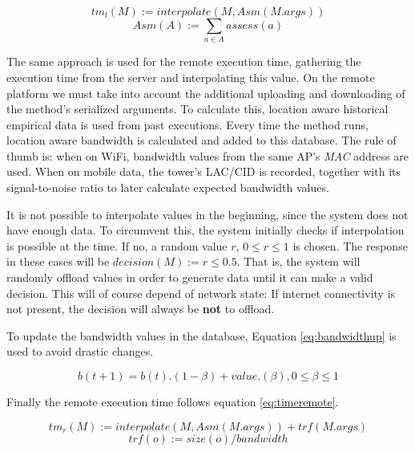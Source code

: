 \documentclass[10pt, conference, letterpaper]{IEEEtran}
\begin{document}
  \begin{equation} \label{eq:timelocal}
    tm_{l}(M) := interpolate(M, Asm(M.args))
  \end{equation}
  \begin{equation}
    Asm(A) := \sum_{a \in A} assess(a)
  \end{equation}

The same approach is used for the remote execution time, gathering the execution time from the server and interpolating this value. On the remote platform we must take into account the additional uploading and downloading of the method's serialized arguments. To calculate this, location aware historical empirical data is used from past executions. Every time the method runs, location aware bandwidth is calculated and added to this database. The rule of thumb is: when on WiFi, bandwidth values from the same AP's \textit{MAC} address are used. When on mobile data, the tower's LAC/CID is recorded, together with its signal-to-noise ratio to later calculate expected bandwidth values.

It is not possible to interpolate values in the beginning, since the system does not have enough data. To circumvent this, the system initially checks if interpolation is possible at the time. If no, a random value $r$, $0 \leq r \leq 1$ is chosen. The response in these cases will be $decision(M) := r \leq 0.5$. That is, the system will randomly offload values in order to generate data until it can make a valid decision. This will of course depend of network state: If internet connectivity is not present, the decision will always be \textbf{not} to offload.

 To update the bandwidth values in the database, Equation \ref{eq:bandwidthup} is used to avoid drastic changes.

  \begin{equation} \label{eq:bandwidthup}
    b(t+1) = b(t) . (1-\beta) + value . (\beta), 0 \leq \beta \leq 1
  \end{equation}

  Finally the remote execution time follows equation \ref{eq:timeremote}.

  \begin{equation} \label{eq:timeremote}
    tm_{r}(M) := interpolate(M, Asm(M.args)) + trf(M.args)
  \end{equation}
  \begin{equation}
    trf(o) := size(o) / bandwidth
  \end{equation}
\end{document}
